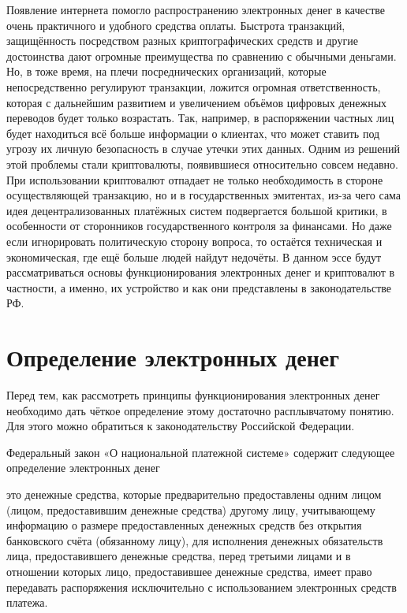 \documentclass[12pt,a4paper]{article}
\begin{document}
Появление интернета помогло распространению электронных денег в качестве очень практичного и удобного средства оплаты. Быстрота транзакций, защищённость посредством разных криптографических средств и другие достоинства дают огромные преимущества по сравнению с обычными деньгами. Но, в тоже время, на плечи посреднических организаций, которые непосредственно регулируют транзакции, ложится огромная ответственность, которая с дальнейшим развитием и увеличением объёмов цифровых денежных переводов будет только возрастать. Так, например, в распоряжении частных лиц будет находиться всё больше информации о клиентах, что может ставить под угрозу их личную безопасность в случае утечки этих данных. Одним из решений этой проблемы стали криптовалюты, появившиеся относительно совсем недавно. При использовании криптовалют отпадает не только необходимость в стороне осуществляющей транзакцию, но и в государственных эмитентах, из-за чего сама идея децентрализованных платёжных систем подвергается большой критики, в особенности от сторонников государственного контроля за финансами. Но даже если игнорировать политическую сторону вопроса, то остаётся техническая и экономическая, где ещё больше людей найдут недочёты. В данном эссе будут рассматриваться основы функционирования электронных денег и криптовалют в частности, а именно, их устройство и как они представлены в законодательстве РФ.

\section{Определение электронных денег}

Перед тем, как рассмотреть принципы функционирования электронных денег необходимо дать чёткое определение этому достаточно расплывчатому понятию. Для этого можно обратиться к законодательству Российской Федерации.

Федеральный закон «О национальной платежной системе» содержит следующее определение электронных денег 

\begin{displayquote}
	это денежные средства, которые предварительно предоставлены одним лицом (лицом, предоставившим денежные средства) другому лицу, учитывающему информацию о размере предоставленных денежных средств без открытия банковского счёта (обязанному лицу), для исполнения денежных обязательств лица, предоставившего денежные средства, перед третьими лицами и в отношении которых лицо, предоставившее денежные средства, имеет право передавать распоряжения исключительно с использованием электронных средств платежа.
\end{displayquote}
\end{document}
